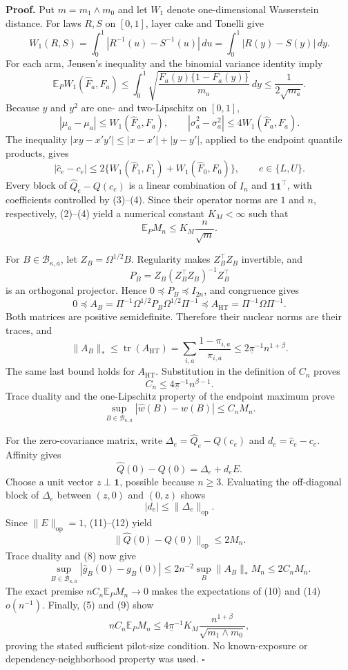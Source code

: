\textbf{Proof.}
Put \(m=m_1\wedge m_0\) and let \(W_1\) denote one-dimensional Wasserstein distance.  For laws \(R,S\) on \([0,1]\), layer cake and Tonelli give
\[
W_1(R,S)=\int_0^1|R^{-1}(u)-S^{-1}(u)|\,du
=\int_0^1|R(y)-S(y)|\,dy.
\tag{1}
\]
For each arm, Jensen's inequality and the binomial variance identity imply
\[
\mathbb E_PW_1(\widehat F_a,F_a)
\le\int_0^1\sqrt{\frac{F_a(y)\{1-F_a(y)\}}{m_a}}\,dy
\le\frac1{2\sqrt{m_a}}.
\tag{2}
\]
Because \(y\) and \(y^2\) are one- and two-Lipschitz on \([0,1]\),
\[
|\widehat\mu_a-\mu_a|\le W_1(\widehat F_a,F_a),
\qquad
|\widehat\sigma_a^2-\sigma_a^2|\le4W_1(\widehat F_a,F_a).
\tag{3}
\]
The inequality \(|xy-x'y'|\le|x-x'|+|y-y'|\), applied to the endpoint quantile products, gives
\[
|\widehat c_e-c_e|
\le2\{W_1(\widehat F_1,F_1)+W_1(\widehat F_0,F_0)\},
\qquad e\in\{L,U\}.
\tag{4}
\]
Every block of \(\widehat Q_e-Q(c_e)\) is a linear combination of \(I_n\) and \(\mathbf1\mathbf1^{\top}\), with coefficients controlled by (3)--(4).  Since their operator norms are \(1\) and \(n\), respectively, (2)--(4) yield a numerical constant \(K_M<\infty\) such that
\[
\mathbb E_PM_n\le K_M\frac n{\sqrt m}.
\tag{5}
\]

For \(B\in\mathcal B_{\kappa,\overline a}\), let \(Z_B=\Omega^{1/2}B\).  Regularity makes \(Z_B^{\top}Z_B\) invertible, and
\[
P_B=Z_B(Z_B^{\top}Z_B)^{-1}Z_B^{\top}
\tag{6}
\]
is an orthogonal projector.  Hence \(0\preceq P_B\preceq I_{2n}\), and congruence gives
\[
0\preceq A_B
=\Pi^{-1}\Omega^{1/2}P_B\Omega^{1/2}\Pi^{-1}
\preceq A_{\mathrm{HT}}=\Pi^{-1}\Omega\Pi^{-1}.
\tag{7}
\]
Both matrices are positive semidefinite.  Therefore their nuclear norms are their traces, and
\[
\lVert A_B\rVert_*
\le\operatorname{tr}(A_{\mathrm{HT}})
=\sum_{i,a}\frac{1-\pi_{i,a}}{\pi_{i,a}}
\le2\underline\pi^{-1}n^{1+\beta}.
\tag{8}
\]
The same last bound holds for \(A_{\mathrm{HT}}\).  Substitution in the definition of \(C_n\) proves
\[
C_n\le4\underline\pi^{-1}n^{\beta-1}.
\tag{9}
\]
Trace duality and the one-Lipschitz property of the endpoint maximum prove
\[
\sup_{B\in\mathcal B_{\kappa,\overline a}}|\widehat w(B)-w(B)|\le C_nM_n.
\tag{10}
\]

For the zero-covariance matrix, write \(\Delta_e=\widehat Q_e-Q(c_e)\) and \(d_e=\widehat c_e-c_e\).  Affinity gives
\[
\widehat Q(0)-Q(0)=\Delta_e+d_eE.
\tag{11}
\]
Choose a unit vector \(z\perp\mathbf1\), possible because \(n\ge3\).  Evaluating the off-diagonal block of \(\Delta_e\) between \((z,0)\) and \((0,z)\) shows
\[
|d_e|\le\lVert\Delta_e\rVert_{\mathrm{op}}.
\tag{12}
\]
Since \(\lVert E\rVert_{\mathrm{op}}=1\), (11)--(12) yield
\[
\lVert\widehat Q(0)-Q(0)\rVert_{\mathrm{op}}\le2M_n.
\tag{13}
\]
Trace duality and (8) now give
\[
\sup_{B\in\mathcal B_{\kappa,\overline a}}|\widehat g_B(0)-g_B(0)|
\le2n^{-2}\sup_B\lVert A_B\rVert_*M_n
\le2C_nM_n.
\tag{14}
\]
The exact premise \(nC_n\mathbb E_PM_n\to0\) makes the expectations of (10) and (14) \(o(n^{-1})\).  Finally, (5) and (9) show
\[
nC_n\mathbb E_PM_n
\le4\underline\pi^{-1}K_M\frac{n^{1+\beta}}{\sqrt{m_1\wedge m_0}},
\]
proving the stated sufficient pilot-size condition.  No known-exposure or dependency-neighborhood property was used. \(\square\)